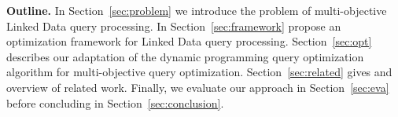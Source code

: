 \textbf{Outline.} In Section~\ref{sec:problem} we introduce the
problem of multi-objective Linked Data query processing. In
Section~\ref{sec:framework} propose an optimization framework for
Linked Data query processing. Section~\ref{sec:opt} describes our
adaptation of the dynamic programming query optimization algorithm for
multi-objective query optimization.  Section~\ref{sec:related} gives
and overview of related work. Finally, we evaluate our approach in
Section~\ref{sec:eva} before concluding in
Section~\ref{sec:conclusion}.




